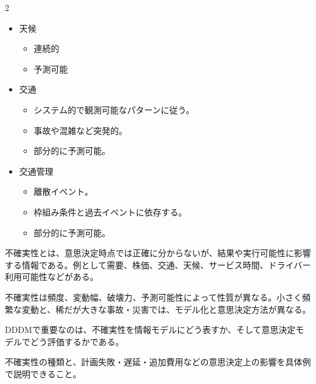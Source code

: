 \begin{multicols}{2}

\footnotesize

\raggedcolumns


\begin{itemize}
\item 天候
\begin{itemize}
\item 連続的
\item 予測可能
\end{itemize}
\item 交通
\begin{itemize}
\item システム的で観測可能なパターンに従う。
\item 事故や混雑など突発的。
\item 部分的に予測可能。
\end{itemize}
\item 交通管理
\begin{itemize}
\item 離散イベント。
\item 枠組み条件と過去イベントに依存する。
\item 部分的に予測可能。
\end{itemize}
\end{itemize}

不確実性とは、意思決定時点では正確に分からないが、結果や実行可能性に影響する情報である。例として需要、株価、交通、天候、サービス時間、ドライバー利用可能性などがある。\par

不確実性は頻度、変動幅、破壊力、予測可能性によって性質が異なる。小さく頻繁な変動と、稀だが大きな事故・災害では、モデル化と意思決定方法が異なる。\par

DDDMで重要なのは、不確実性を情報モデルにどう表すか、そして意思決定モデルでどう評価するかである。\par

不確実性の種類と、計画失敗・遅延・追加費用などの意思決定上の影響を具体例で説明できること。\par


\end{multicols}
